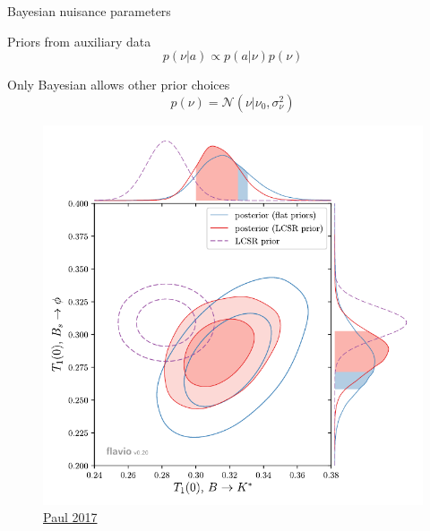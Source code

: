 \documentclass[
aspectratio=169,
14pt,
professionalfonts
]{beamer}
\begin{document}
\begin{frame}{Bayesian nuisance parameters}
    \begin{minipage}{0.6\textwidth}
        Priors from auxiliary data
        $$p(\nu|a) \propto p(a|\nu) p(\nu)$$
        
        Only Bayesian allows other prior choices
        $$ p(\nu) = \mathcal{N}(\nu | \nu_0, \sigma_\nu^2)$$
        
    \end{minipage}
    \begin{minipage}{0.39\textwidth}
        \begin{figure}
            \centering
            \includegraphics[width=\textwidth]{../plots/straub-posterior.pdf}
            \flushright \small
        \href{https://arxiv.org/pdf/2311.14647}{Paul 2017}
        \end{figure}
    \end{minipage}
\end{frame}
\end{document}
